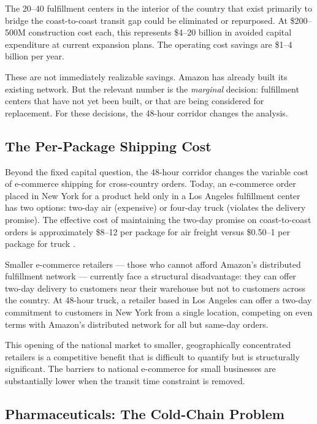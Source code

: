 The 20--40 fulfillment centers in the interior of the country that exist primarily to
bridge the coast-to-coast transit gap could be eliminated or repurposed. At \$200--500M
construction cost each, this represents \$4--20 billion in avoided capital expenditure
at current expansion plans. The operating cost savings are \$1--4 billion per year.

These are not immediately realizable savings. Amazon has already built its existing network.
But the relevant number is the \textit{marginal} decision: fulfillment centers that have
not yet been built, or that are being considered for replacement. For these decisions,
the 48-hour corridor changes the analysis.

\subsection{The Per-Package Shipping Cost}

Beyond the fixed capital question, the 48-hour corridor changes the variable cost of
e-commerce shipping for cross-country orders. Today, an e-commerce order placed in
New York for a product held only in a Los Angeles fulfillment center has two options:
two-day air (expensive) or four-day truck (violates the delivery promise). The effective
cost of maintaining the two-day promise on coast-to-coast orders is approximately
\$8--12 per package for air freight versus \$0.50--1 per package for truck
\citep{FHWA_freight2023}.

Smaller e-commerce retailers --- those who cannot afford Amazon's distributed
fulfillment network --- currently face a structural disadvantage: they can offer
two-day delivery to customers near their warehouse but not to customers across the
country. At 48-hour truck, a retailer based in Los Angeles can offer a two-day
commitment to customers in New York from a single location, competing on even terms
with Amazon's distributed network for all but same-day orders.

This opening of the national market to smaller, geographically concentrated retailers
is a competitive benefit that is difficult to quantify but is structurally significant.
The barriers to national e-commerce for small businesses are substantially lower when
the transit time constraint is removed.

\subsection{Pharmaceuticals: The Cold-Chain Problem}


